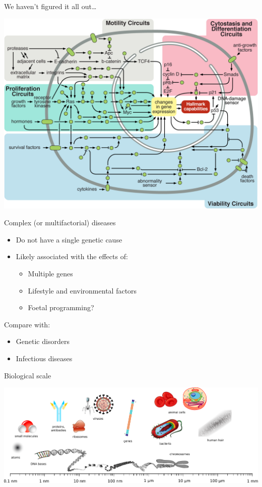 \begin{frame}{We haven't figured it all out\ldots}
    \begin{center}
        \includegraphics[height=0.9\textheight]{figures/cancer_signalling}
    \end{center}
\end{frame}

\begin{frame}{Complex (or multifactorial) diseases}
    \begin{itemize}
        \item Do \alert{not} have a single genetic cause
        \item Likely associated with the effects of:
              \begin{itemize}
                  \item Multiple genes
                  \item Lifestyle and environmental factors
                  \item Foetal programming?
              \end{itemize}
    \end{itemize}
    \vfill
    Compare with:
    \begin{itemize}
        \item Genetic disorders
        \item Infectious diseases
    \end{itemize}
\end{frame}

\begin{frame}{Biological scale}
    \begin{center}
        \includegraphics[width=\textwidth]{figures/bio_scale}
    \end{center}
\end{frame}

